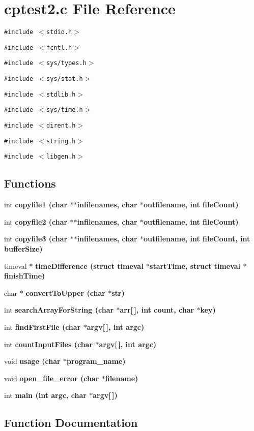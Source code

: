 \section{cptest2.c File Reference}
\label{cptest2_8c}
{\tt \#include $<$stdio.h$>$}\par
{\tt \#include $<$fcntl.h$>$}\par
{\tt \#include $<$sys/types.h$>$}\par
{\tt \#include $<$sys/stat.h$>$}\par
{\tt \#include $<$stdlib.h$>$}\par
{\tt \#include $<$sys/time.h$>$}\par
{\tt \#include $<$dirent.h$>$}\par
{\tt \#include $<$string.h$>$}\par
{\tt \#include $<$libgen.h$>$}\par
\subsection*{Functions}
\begin{CompactItemize}
\item 
int \bf{copyfile1} (char $\ast$$\ast$infilenames, char $\ast$outfilename, int file\-Count)
\item 
int \bf{copyfile2} (char $\ast$$\ast$infilenames, char $\ast$outfilename, int file\-Count)
\item 
int \bf{copyfile3} (char $\ast$$\ast$infilenames, char $\ast$outfilename, int file\-Count, int buffer\-Size)
\item 
timeval $\ast$ \bf{time\-Difference} (struct timeval $\ast$start\-Time, struct timeval $\ast$finish\-Time)
\item 
char $\ast$ \bf{convert\-To\-Upper} (char $\ast$str)
\item 
int \bf{search\-Array\-For\-String} (char $\ast$arr[$\,$], int count, char $\ast$key)
\item 
int \bf{find\-First\-File} (char $\ast$argv[$\,$], int argc)
\item 
int \bf{count\-Input\-Files} (char $\ast$argv[$\,$], int argc)
\item 
void \bf{usage} (char $\ast$program\_\-name)
\item 
void \bf{open\_\-file\_\-error} (char $\ast$filename)
\item 
int \bf{main} (int argc, char $\ast$argv[$\,$])
\end{CompactItemize}


\subsection{Function Documentation}
